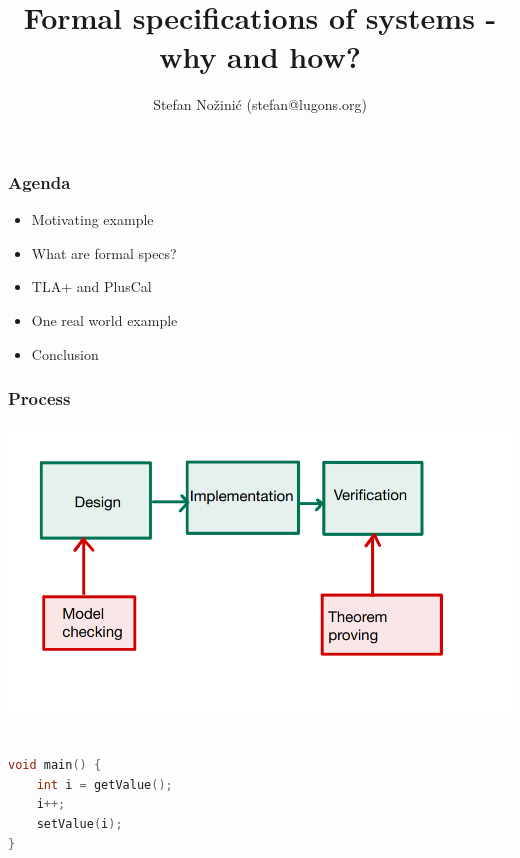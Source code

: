 \documentclass{beamer}
\begin{document}
\title{Formal specifications of systems - why and how?}
\author{Stefan Nožinić (stefan@lugons.org)}

\frame{
\titlepage
}

\begin{frame}
    \frametitle{Agenda}
    \begin{itemize}
        \item Motivating example
        \item What are formal specs? 
        \item TLA+ and PlusCal
        \item One real world example
        \item Conclusion
    \end{itemize}

\end{frame}


\begin{frame}
    \frametitle{Process}
    \includegraphics[width=\textwidth]{img/2.png}
\end{frame}

\begin{frame}[fragile]
	\begin{lstlisting}[language=C++]

void main() {
    int i = getValue();
    i++;
    setValue(i);
}

	\end{lstlisting}
	
\end{frame}
\end{document}

